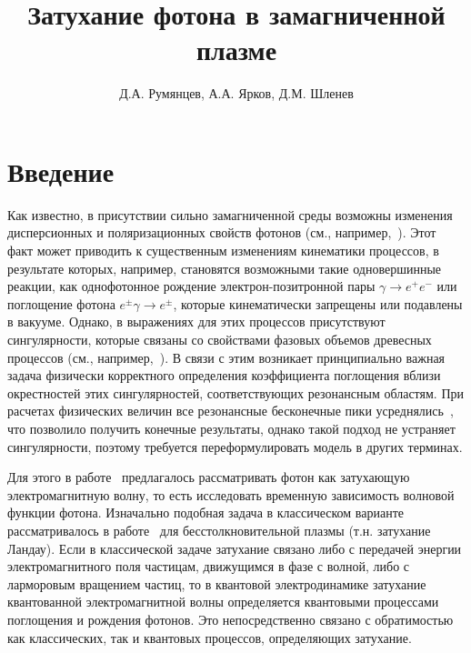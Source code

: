 \documentclass[14pt, russian]{article}
\begin{document}

\title{Затухание фотона в замагниченной плазме}
\author{Д.А. Румянцев, А.А. Ярков, Д.М. Шленев}
\date{}
\maketitle


\section{Введение}

Как известно, в присутствии сильно замагниченной среды 
возможны изменения дисперсионных и поляризационных свойств фотонов (см., например,~\cite{KuznMikh}). Этот факт 
может приводить к существенным изменениям кинематики процессов, в результате 
которых, например, становятся возможными такие одновершинные реакции, как однофотонное 
рождение электрон-позитронной пары $\gamma\to e^+e^-$ или поглощение фотона 
$e^{\pm}\gamma\to e^{\pm}$, которые кинематически запрещены или подавлены в 
вакууме. Однако, в выражениях для этих процессов присутствуют сингулярности, которые связаны со свойствами фазовых объемов древесных процессов (см., например,~\cite{Klepikov:1954,Sturrock:1971,Tademaru:1973,Daugherty:1983,Shabad:1988}). В связи с этим возникает принципиально важная задача физически корректного определения коэффициента поглощения вблизи окрестностей этих сингулярностей, соответствующих резонансным областям. При расчетах физических величин все резонансные бесконечные пики усреднялись~\cite{Baier:2007}, что позволило получить конечные результаты, однако такой подход не устраняет сингулярности, поэтому требуется переформулировать модель в других терминах.

Для этого в работе~\cite{Shabad:1988} предлагалось рассматривать фотон как затухающую электромагнитную волну, то есть исследовать временную зависимость волновой функции фотона. Изначально подобная задача в классическом варианте рассматривалось в работе~\cite{Landau:1946} для бесстолкновительной плазмы (т.н. затухание Ландау). Если в классической задаче затухание связано либо с передачей энергии электромагнитного поля частицам, движущимся в фазе с волной, либо с ларморовым вращением частиц, то в квантовой электродинамике затухание квантованной электромагнитной волны определяется квантовыми процессами поглощения и рождения фотонов. Это непосредственно связано с обратимостью как классических, так и квантовых процессов, определяющих затухание.
\end{document}
